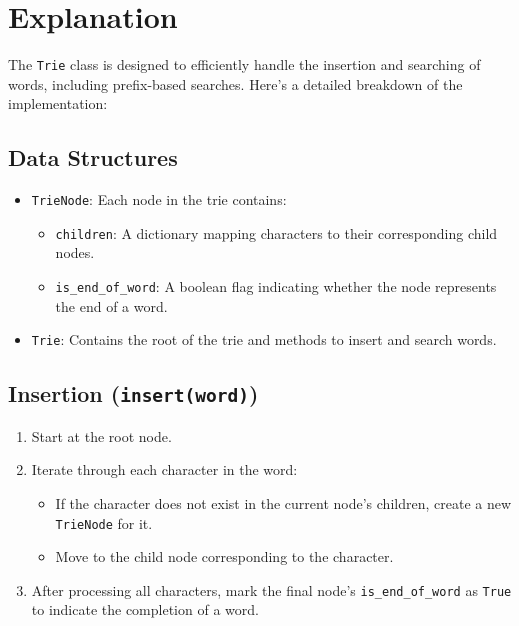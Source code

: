 \section*{Explanation}

The \texttt{Trie} class is designed to efficiently handle the insertion and searching of words, including prefix-based searches. Here's a detailed breakdown of the implementation:

\subsection*{Data Structures}
\begin{itemize}
    \item \texttt{TrieNode}:  
    Each node in the trie contains:
    \begin{itemize}
        \item \texttt{children}: A dictionary mapping characters to their corresponding child nodes.
        \item \texttt{is\_end\_of\_word}: A boolean flag indicating whether the node represents the end of a word.
    \end{itemize}
    
    \item \texttt{Trie}:  
    Contains the root of the trie and methods to insert and search words.
\end{itemize}

\subsection*{Insertion (\texttt{insert(word)})}
\begin{enumerate}
    \item Start at the root node.
    \item Iterate through each character in the word:
    \begin{itemize}
        \item If the character does not exist in the current node's children, create a new \texttt{TrieNode} for it.
        \item Move to the child node corresponding to the character.
    \end{itemize}
    \item After processing all characters, mark the final node's \texttt{is\_end\_of\_word} as \texttt{True} to indicate the completion of a word.
\end{enumerate}

